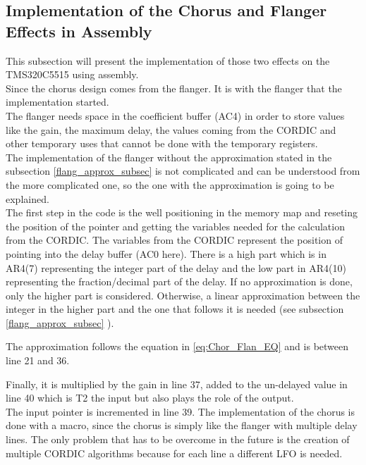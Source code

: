 \subsection{Implementation of the Chorus and Flanger Effects in Assembly}

This subsection will present the implementation of those two effects on the TMS320C5515 using assembly. \\
Since the chorus design comes from the flanger. It is with the flanger that the implementation started. \\
The flanger needs space in the coefficient buffer (AC4) in order to store values like the gain, the maximum delay, the values coming from the CORDIC and other temporary uses that cannot be done with the temporary registers. \\
The implementation of the flanger without the approximation stated in the subsection \ref{flang_approx_subsec} is not complicated and can be understood from the more complicated one, so the one with the approximation is going to be explained. \\
The first step in the code is the well positioning in the memory map and reseting the position of the pointer and getting the variables needed for the calculation from the CORDIC.
The variables from the CORDIC represent the position of pointing into the delay buffer (AC0 here). There is a high part which is in AR4(7) representing the integer part of the delay and the low part in AR4(10) representing the fraction/decimal part of the delay. If no approximation is done, only the higher part is considered. Otherwise, a linear approximation between the integer in the higher part and the one that follows it is needed (see subsection \ref{flang_approx_subsec} ). 

The approximation follows the equation in \ref{eq:Chor_Flan_EQ} and is between line 21 and 36. 


Finally, it is multiplied by the gain in line 37, added to the un-delayed value in line 40 which is T2 the input but also plays the role of the output. \\
The input pointer is incremented in line 39. 
The implementation of the chorus is done with a macro, since the chorus is simply like the flanger with multiple delay lines. The only problem that has to be overcome in the future is the creation of multiple CORDIC algorithms because for each line a different LFO is needed. \\
